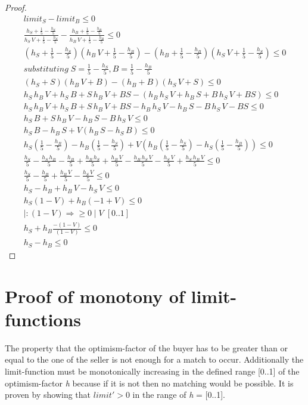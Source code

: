 \documentclass[Bachelorarbeit.tex]{subfiles}
\begin{document}
\begin{proof}
\begin{align*}
	limit_S - limit_B \leq 0
	\\ \frac{h_S + \frac{1}{5} - \frac{h_S}{5}}{h_S \, V + \frac{1}{5} - \frac{h_S}{5}} - \frac{h_B + \frac{1}{5} - \frac{h_B}{5}}{h_B \, V + \frac{1}{5} - \frac{h_B}{5}} \leq 0
	\\ (h_S + \frac{1}{5} - \frac{h_S}{5})(h_B \, V + \frac{1}{5} - \frac{h_B}{5}) - (h_B + \frac{1}{5} - \frac{h_B}{5})(h_S \, V + \frac{1}{5} - \frac{h_S}{5}) \leq 0													
	\\ substituting \; S = \frac{1}{5} - \frac{h_S}{5}, B = \frac{1}{5} - \frac{h_B}{5}
	\\ (h_S + S)(h_B \, V + B) - (h_B + B)(h_S \, V + S) \leq 0
	\\ h_S \, h_B \, V + h_S \, B + S \, h_B \, V + BS - (h_B \, h_S \, V + h_B \, S + B \, h_S \, V + BS) \leq 0
	\\ h_S \, h_B \, V + h_S \, B + S \, h_B \, V + BS - h_B \, h_S \, V - h_B \, S - B \, h_S \, V - BS \leq 0
	\\ h_S \, B + S \, h_B \, V - h_B \, S - B \, h_S \, V \leq 0
	\\ h_S \, B - h_B \, S + V(h_B \, S - h_S \, B ) \leq 0 
	\\ h_S(\frac{1}{5} - \frac{h_B}{5}) - h_B(\frac{1}{5} - \frac{h_S}{5}) + V(h_B(\frac{1}{5} - \frac{h_S}{5}) - h_S(\frac{1}{5} - \frac{h_B}{5})) \leq 0
	\\ \frac{h_S}{5} - \frac{h_S \, h_B}{5} - \frac{h_B}{5} + \frac{h_B \, h_S}{5} + \frac{h_B \, V}{5} - \frac{h_B \, h_S \, V}{5} - \frac{h_S \, V}{5} + \frac{h_S \, h_B \, V}{5} \leq 0 
	\\ \frac{h_S}{5} - \frac{h_B}{5} + \frac{h_B \, V}{5} - \frac{h_S \, V}{5} \leq 0
	\\ h_S - h_B + h_B \, V - h_S \, V \leq 0 
	\\ h_S( 1 - V ) + h_B( -1 + V ) \leq 0 
	\\ |: (1-V) \Rightarrow \geq 0 \; | \; V \; [0..1]
	\\ h_S + h_B \frac{-(1-V)}{(1-V)} \leq 0
	\\ h_S - h_B \leq 0
\end{align*}
\end{proof}

\section{Proof of monotony of limit-functions}
The property that the optimism-factor of the buyer has to be greater than or equal to the one of the seller is not enough for a match to occur. Additionally the limit-function must be monotonically increasing in the defined range [0..1] of the optimism-factor \textit{h} because if it is not then no matching would be possible. It is proven by showing that $limit' > 0$ in the range of \textit{h} = [0..1].
\end{document}
